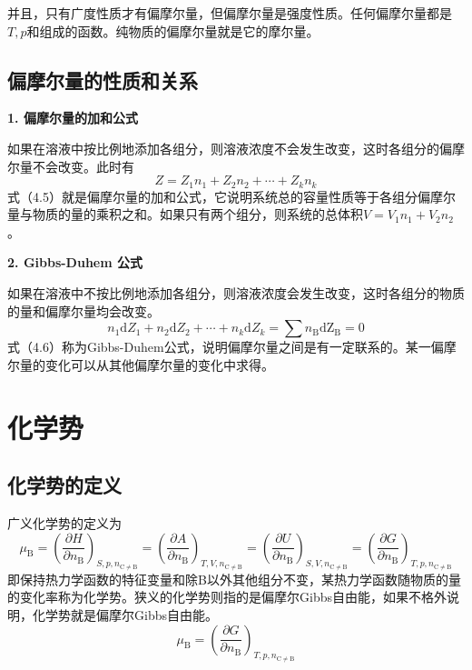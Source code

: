\documentclass[lang=cn,newtx,10pt,scheme=chinese]{elegantbook}
\begin{document}
并且，只有广度性质才有偏摩尔量，但偏摩尔量是强度性质。任何偏摩尔量都是$T,p$和组成的函数。纯物质的偏摩尔量就是它的摩尔量。

\subsection{偏摩尔量的性质和关系}
\textbf{1. 偏摩尔量的加和公式}

如果在溶液中按比例地添加各组分，则溶液浓度不会发生改变，这时各组分的偏摩尔量不会改变。此时有
\begin{equation}
	Z = Z_1n_1+Z_2n_2+\cdots+Z_kn_k
\end{equation}
式（4.5）就是偏摩尔量的加和公式，它说明系统总的容量性质等于各组分偏摩尔量与物质的量的乘积之和。如果只有两个组分，则系统的总体积$V=V_1n_1+V_2n_2$。

\textbf{2. Gibbs-Duhem 公式}

如果在溶液中不按比例地添加各组分，则溶液浓度会发生改变，这时各组分的物质的量和偏摩尔量均会改变。
\begin{equation}
	n_1\mathrm{d}Z_1+n_2\mathrm{d}Z_2+\cdots +n_k\mathrm{d}Z_k=\sum n_\mathrm{B}\mathrm{dZ_\mathrm{B} }=0    
\end{equation}
式（4.6）称为Gibbs-Duhem公式，说明偏摩尔量之间是有一定联系的。某一偏摩尔量的变化可以从其他偏摩尔量的变化中求得。

\section{化学势}
\subsection{化学势的定义}
广义化学势的定义为
\begin{equation}
	\mu _\mathrm{B}=\left ( \frac{\partial H}{\partial n_\mathrm{B} }  \right )_{S,p,n_{\mathrm{C}\ne\mathrm{B}  }} =\left ( \frac{\partial A}{\partial n_\mathrm{B} }  \right )_{T,V,n_{\mathrm{C}\ne\mathrm{B}  }} = \left ( \frac{\partial U}{\partial n_\mathrm{B} }  \right )_{S,V,n_{\mathrm{C}\ne\mathrm{B}  }} = \left ( \frac{\partial G}{\partial n_\mathrm{B} }  \right )_{T,p,n_{\mathrm{C}\ne\mathrm{B}  }}
\end{equation}
即保持热力学函数的特征变量和除B以外其他组分不变，某热力学函数随物质的量的变化率称为化学势。狭义的化学势则指的是偏摩尔Gibbs自由能，如果不格外说明，化学势就是偏摩尔Gibbs自由能。
\begin{equation}
	\mu _\mathrm{B}=\left ( \frac{\partial G}{\partial n_\mathrm{B} }  \right )_{T,p,n_{\mathrm{C}\ne\mathrm{B}  }}
\end{equation}
\end{document}
